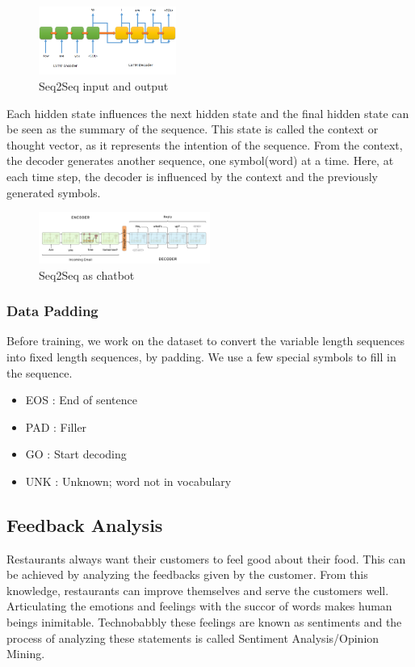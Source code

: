 \documentclass[conference]{IEEEtran}
\begin{document}
\begin{figure}[!ht]
	\centering
	\includegraphics[width=0.4\textwidth]{seq.png}
	\caption{Seq2Seq input and output}
\end{figure}

Each hidden state influences the next hidden state and the final hidden state can be seen as the summary of the sequence. This state is called the context or thought vector, as it represents the intention of the sequence. From the context, the decoder generates another sequence, one symbol(word) at a time. Here, at each time step, the decoder is influenced by the context and the previously generated symbols.

\begin{figure}[!ht]
	\centering
	\includegraphics[width=0.5\textwidth]{chat.png}
	\caption{Seq2Seq as chatbot}
\end{figure}

\subsubsection{Data Padding}
Before training, we work on the dataset to convert the variable length sequences into fixed length sequences, by padding. We use a few special symbols to fill in the sequence.

\begin{itemize}
	
	\item EOS : End of sentence
	\item PAD : Filler
	\item GO : Start decoding
	\item UNK : Unknown; word not in vocabulary
	
\end{itemize}



\subsection{\textbf{Feedback Analysis}}
Restaurants always want their customers to feel good about their food. This can be achieved by analyzing the feedbacks given by the customer. From this knowledge, restaurants can improve themselves and serve the customers well.\\
Articulating the emotions and feelings with the succor of words makes human beings inimitable. Technobabbly these feelings are known as sentiments and the process of analyzing these statements is called Sentiment Analysis/Opinion Mining\cite{b7}. 
\end{document}
